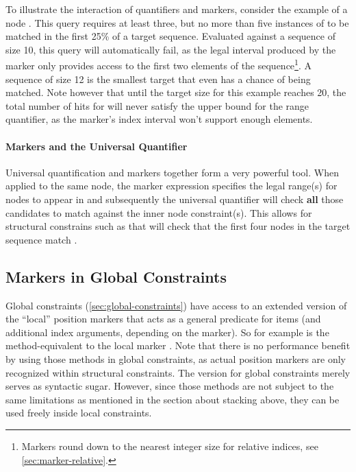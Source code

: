 \documentclass[11pt,a4paper]{report}
\begin{document}
To illustrate the interaction of quantifiers and markers, consider the example of a node .
This query requires at least three, but no more than five instances of  to be matched in the first 25\% of a target sequence.
Evaluated against a sequence of size 10, this query will automatically fail, as the legal interval produced by the marker only provides access to the first two elements of the sequence\footnote{Markers round down to the nearest integer size for relative indices, see \cref{sec:marker-relative}.}.
A sequence of size 12 is the smallest target that even has a chance of being matched.
Note however that until the target size for this example reaches 20, the total number of hits for  will never satisfy the upper bound for the range quantifier, as the marker's index interval won't support enough elements.

\paragraph{Markers and the Universal Quantifier}

\noindent Universal quantification and markers together form a very powerful tool. When applied to the same node, the marker expression specifies the legal range(s) for nodes to appear in and subsequently the universal quantifier will check \textbf{all} those candidates to match against the inner node constraint(s). This allows for structural constrains such as \query{*[\$x: isBefore(5),]} that will check that the first four nodes in the target sequence match .

\subsection{Markers in Global Constraints}
\label{sec:marker-global}
Global constraints (\ref{sec:global-constraints}) have access to an extended version of the ``local'' position markers that acts as a general predicate for items (and additional index arguments, depending on the marker).
So for example  is the method-equivalent to the local marker \query{[\$x: isLast,]}.
Note that there is no performance benefit by using those methods in global constraints, as actual position markers are only recognized within structural constraints.
The version for global constraints merely serves as syntactic sugar.
However, since those methods are not subject to the same limitations as mentioned in the section about stacking above, they can be used freely inside local constraints.
\end{document}
